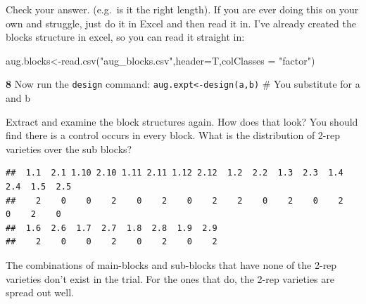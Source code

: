 \documentclass[
]{book}
\makeatletter
\newenvironment{Shaded}{\begin{snugshade}}{\end{snugshade}}
\newcommand{\AttributeTok}[1]{\textcolor[rgb]{0.77,0.63,0.00}{#1}}
\newcommand{\DecValTok}[1]{\textcolor[rgb]{0.00,0.00,0.81}{#1}}
\newcommand{\FunctionTok}[1]{\textcolor[rgb]{0.00,0.00,0.00}{#1}}
\newcommand{\NormalTok}[1]{#1}
\newcommand{\OtherTok}[1]{\textcolor[rgb]{0.56,0.35,0.01}{#1}}
\newcommand{\SpecialCharTok}[1]{\textcolor[rgb]{0.00,0.00,0.00}{#1}}
\newcommand{\StringTok}[1]{\textcolor[rgb]{0.31,0.60,0.02}{#1}}
\newenvironment{kframe}{%
\medskip{}
\setlength{\fboxsep}{.8em}
 \def\at@end@of@kframe{}%
 \ifinner\ifhmode%
  \def\at@end@of@kframe{\end{minipage}}%
  \begin{minipage}{\columnwidth}%
 \fi\fi%
 \def\FrameCommand##1{\hskip\@totalleftmargin \hskip-\fboxsep
 \colorbox{shadecolor}{##1}\hskip-\fboxsep
     \hskip-\linewidth \hskip-\@totalleftmargin \hskip\columnwidth}%
 \MakeFramed {\advance\hsize-\width
   \@totalleftmargin\z@ \linewidth\hsize
   \@setminipage}}%
 {\par\unskip\endMakeFramed%
 \at@end@of@kframe}
\newenvironment{rmdblock}[1]
  {
  \begin{itemize}
  \renewcommand{\labelitemi}{
    \raisebox{-.7\height}[0pt][0pt]{
      {\setkeys{Gin}{width=3em,keepaspectratio}\texttt{[image: images/\#1]}}
    }
  }
  \setlength{\fboxsep}{1em}
  \begin{kframe}
  \item
  }
  {
  \end{kframe}
  \end{itemize}
  }
\newenvironment{rmdquiz}
  {\begin{rmdblock}{quiz}}
  {\end{rmdblock}}
\makeatother
\begin{document}
Check your answer. (e.g.~is it the right length). If you are ever doing this on your own and struggle, just do it in Excel and then read it in. I've already created the blocks structure in excel, so you can read it straight in:

\begin{Shaded}
\begin{Highlighting}[]
\NormalTok{aug.blocks}\OtherTok{\textless{}{-}}\FunctionTok{read.csv}\NormalTok{(}\StringTok{"aug\_blocks.csv"}\NormalTok{,}\AttributeTok{header=}\NormalTok{T,}\AttributeTok{colClasses =} \StringTok{"factor"}\NormalTok{)}
\end{Highlighting}
\end{Shaded}

\begin{rmdquiz}
\textbf{8} Now run the \texttt{design} command:
\texttt{aug.expt\textless{}-design(a,b)} \# You substitute for a and b
\end{rmdquiz}

Extract and examine the block structures again. How does that look?
You should find there is a control occurs in every block. What is the distribution of 2-rep varieties over the sub blocks?

\begin{Shaded}
\end{Shaded}

\begin{verbatim}
##  1.1  2.1 1.10 2.10 1.11 2.11 1.12 2.12  1.2  2.2  1.3  2.3  1.4  2.4  1.5  2.5 
##    2    0    0    2    0    2    0    2    2    0    2    0    2    0    2    0 
##  1.6  2.6  1.7  2.7  1.8  2.8  1.9  2.9 
##    2    0    0    2    0    2    0    2
\end{verbatim}

The combinations of main-blocks and sub-blocks that have none of the 2-rep varieties don't exist in the trial. For the ones that do, the 2-rep varieties are spread out well.
\end{document}
